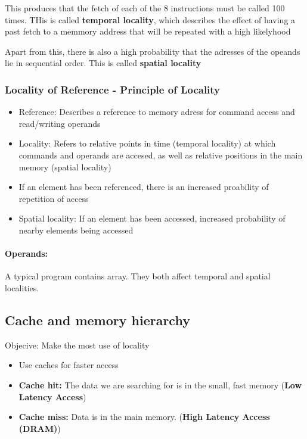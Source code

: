 \documentclass{article}
\begin{document}
This produces that the fetch of each of the 8 instructions must be called 100 times. THis is called \textbf{temporal locality}, which describes the effect of having a past fetch to a memmory address that will be repeated with a high likelyhood

Apart from this, there is also a high probability that the adresses of the opeands lie in sequential order. This is called \textbf{spatial locality}

\subsubsection{Locality of Reference - Principle of Locality}
\begin{itemize}
  \item Reference: Describes a reference to memory adress for command access and read/writing operands
  \item Locality: Refers to relative points in time (temporal locality) at which commands and operands are accesed, as well as relative positions in the main memory (spatial locality)
  \item If an element has been referenced, there is an increased proability of repetition of access
  \item Spatial locality: If an element has been accessed, increased probability of nearby elements being accessed
\end{itemize}

\paragraph{Operands: } A typical program contains array. They both affect temporal and spatial localities.

\subsection{Cache and memory hierarchy}
Objecive: Make the most use of locality


\begin{itemize}
  \item Use caches for faster access
  \item \textbf{Cache hit: } The data we are searching for is in the small, fast memory (\textbf{Low Latency Access})
  \item \textbf{Cache miss: } Data is in the main memory. (\textbf{High Latency Access (DRAM)})
\end{itemize}
\end{document}
